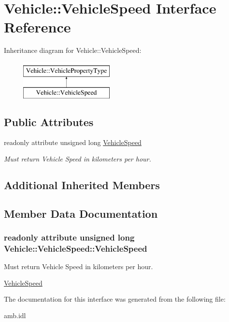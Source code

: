 \hypertarget{interfaceVehicle_1_1VehicleSpeed}{\section{Vehicle\-:\-:Vehicle\-Speed Interface Reference}
\label{interfaceVehicle_1_1VehicleSpeed}
}
Inheritance diagram for Vehicle\-:\-:Vehicle\-Speed\-:\begin{figure}[H]
\begin{center}
\leavevmode
\includegraphics[height=2.000000cm]{interfaceVehicle_1_1VehicleSpeed}
\end{center}
\end{figure}
\subsection*{Public Attributes}
\begin{DoxyCompactItemize}
\item 
readonly attribute unsigned long \hyperlink{interfaceVehicle_1_1VehicleSpeed_abf20d172bd1ca542dd28e091da982cba}{Vehicle\-Speed}
\begin{DoxyCompactList}\small\item\em Must return Vehicle Speed in kilometers per hour. \end{DoxyCompactList}\end{DoxyCompactItemize}
\subsection*{Additional Inherited Members}


\subsection{Member Data Documentation}
\hypertarget{interfaceVehicle_1_1VehicleSpeed_abf20d172bd1ca542dd28e091da982cba}{
\subsubsection[{Vehicle\-Speed}]{\setlength{\rightskip}{0pt plus 5cm}readonly attribute unsigned long Vehicle\-::\-Vehicle\-Speed\-::\-Vehicle\-Speed}}\label{interfaceVehicle_1_1VehicleSpeed_abf20d172bd1ca542dd28e091da982cba}


Must return Vehicle Speed in kilometers per hour. 

\hyperlink{interfaceVehicle_1_1VehicleSpeed}{Vehicle\-Speed} 

The documentation for this interface was generated from the following file\-:\begin{DoxyCompactItemize}
\item 
amb.\-idl\end{DoxyCompactItemize}
